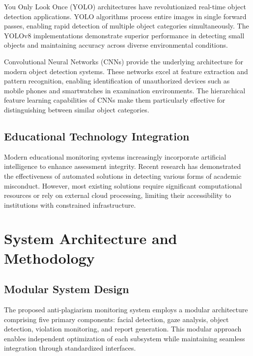 \documentclass[conference]{IEEEtran}
\begin{document}
You Only Look Once (YOLO) architectures have revolutionized real-time object detection 
applications. YOLO algorithms process entire images in single forward passes, enabling 
rapid detection of multiple object categories simultaneously\cite{wang2022object}. The 
YOLOv8 implementations demonstrate superior performance in detecting small objects 
and maintaining accuracy across diverse environmental conditions\cite{v7labs2023yolo}.

Convolutional Neural Networks (CNNs) provide the underlying architecture for modern object 
detection systems\cite{goodfellow2016deep}. These networks excel at feature extraction 
and pattern recognition, enabling identification of unauthorized devices such as mobile 
phones and smartwatches in examination environments. The hierarchical feature learning 
capabilities of CNNs make them particularly effective for distinguishing between similar 
object categories\cite{paszke2019pytorch}.

\subsection{Educational Technology Integration}

Modern educational monitoring systems increasingly incorporate artificial intelligence 
to enhance assessment integrity\cite{russell2020artificial}. Recent research has demonstrated 
the effectiveness of automated solutions in detecting various forms of academic 
misconduct\cite{honorlock2023detecting}. However, most existing solutions require significant 
computational resources or rely on external cloud processing, limiting their accessibility 
to institutions with constrained infrastructure.

\section{System Architecture and Methodology}

\subsection{Modular System Design}

The proposed anti-plagiarism monitoring system employs a modular architecture comprising 
five primary components: facial detection, gaze analysis, object detection, violation 
monitoring, and report generation. This modular approach enables independent optimization 
of each subsystem while maintaining seamless integration through standardized interfaces.
\end{document}
